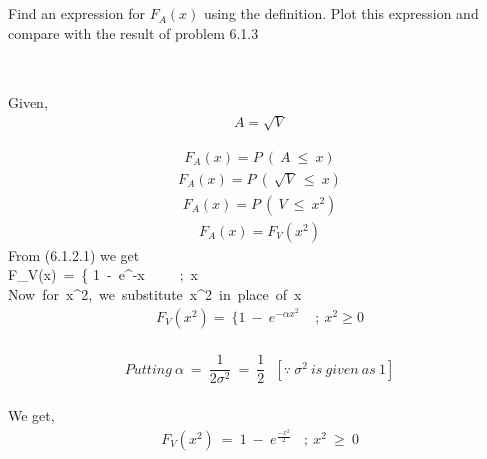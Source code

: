 \documentclass[journal,12pt,twocolumn]{IEEEtran}
\begin{document}
\subsection*{}
Find an expression for $F_A(x)$ using the definition. Plot this expression and compare with the result of problem 6.1.3
\subsection*{}\\
Given,
\begin{align}
A = \sqrt{V}
\end{align}

\begin{align} F_A(x) = P\ (\ A\ \leq\ x)\end{align}
\begin{align} F_A(x) = P\ (\ \sqrt{V}\ \leq\ x)\end{align}
\begin{align} F_A(x) = P\ (\ V\ \leq\ x^2)\end{align}
\begin{align} F_A(x) = F_V(x^2)\end{align}
From (6.1.2.1) we get\\

F_V(x)\ =\ \Bigg\{ 1\ -\ e^{-\alpha x}\ \ \ \ \ ;\ x \\

Now\ for\ x^2,\ we\ substitute\ x^2\ in\ place\ of\ x\\

\begin{align}F_V(x^2) = \ \Bigg\{ 1\ -\ e^{-\alpha x^2}\ \ \ \ \ ;\ x^2 \geq 0\end{align}\\


\begin{align*}Putting\ \alpha\ =\ \dfrac{1}{2\sigma^2}\ =\ \dfrac{1}{2}\ \ \ [\because \ \sigma^2\ is\ given\ as\ 1]\end{align*}\\
We get,\\
\begin{align} F_V(x^2)\ =\ 1\ -\ e^\frac{-x^2}{2}\ \ \ \ ;\ x^2\ \geq\ 0\end{align}\\
\end{document}
